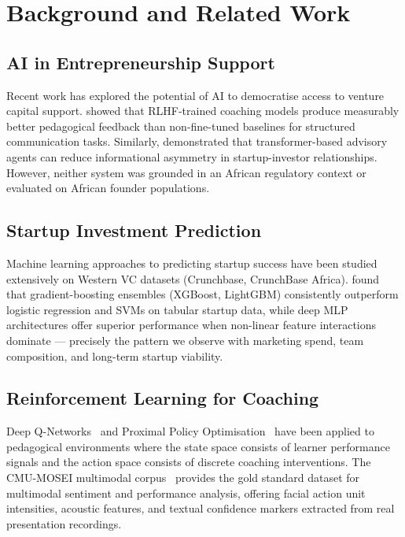 \documentclass{article}
\begin{document}

\FloatBarrier
\section{Background and Related Work}

\FloatBarrier
\subsection{AI in Entrepreneurship Support}

Recent work has explored the potential of AI to democratise access to venture
capital support. \citet{wangentrep2025} showed
that RLHF-trained coaching models produce measurably better pedagogical feedback
than non-fine-tuned baselines for structured communication tasks. Similarly,
\citet{fourati2025} demonstrated that transformer-based
advisory agents can reduce informational asymmetry in startup-investor
relationships. However, neither system was grounded in an African regulatory
context or evaluated on African founder populations.

\FloatBarrier
\subsection{Startup Investment Prediction}

Machine learning approaches to predicting startup success have been studied
extensively on Western VC datasets (Crunchbase, CrunchBase Africa).
\citet{shanmug2024} found that gradient-boosting ensembles
(XGBoost, LightGBM) consistently outperform logistic regression and SVMs on
tabular startup data, while deep MLP architectures offer superior performance
when non-linear feature interactions dominate — precisely the pattern we observe
with marketing spend, team composition, and long-term startup viability.

\FloatBarrier
\subsection{Reinforcement Learning for Coaching}

Deep Q-Networks~\citep{mnih2015} and Proximal Policy
Optimisation~\citep{schulman2017} have been applied to pedagogical
environments where the state space consists of learner performance signals and
the action space consists of discrete coaching interventions. The CMU-MOSEI
multimodal corpus~\citep{zadeh2018} provides the gold standard dataset for
multimodal sentiment and performance analysis, offering facial action unit
intensities, acoustic features, and textual confidence markers extracted from
real presentation recordings.
\end{document}
